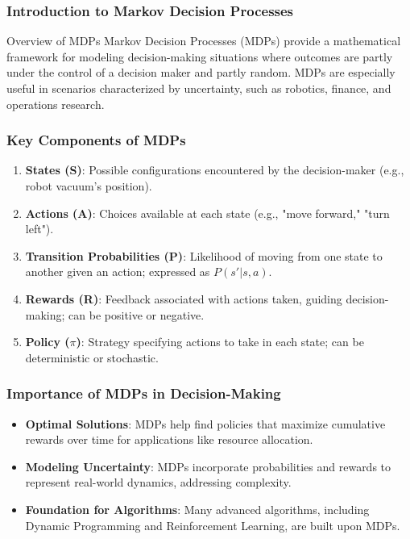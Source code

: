 \documentclass[aspectratio=169]{beamer}
\begin{document}
\frame{\titlepage}

\begin{frame}[fragile]
    \frametitle{Introduction to Markov Decision Processes}
    \begin{block}{Overview of MDPs}
        Markov Decision Processes (MDPs) provide a mathematical framework for modeling decision-making situations where outcomes are partly under the control of a decision maker and partly random. MDPs are especially useful in scenarios characterized by uncertainty, such as robotics, finance, and operations research.
    \end{block}
\end{frame}

\begin{frame}[fragile]
    \frametitle{Key Components of MDPs}
    \begin{enumerate}
        \item \textbf{States (S)}: Possible configurations encountered by the decision-maker (e.g., robot vacuum's position).
        \item \textbf{Actions (A)}: Choices available at each state (e.g., "move forward," "turn left").
        \item \textbf{Transition Probabilities (P)}: Likelihood of moving from one state to another given an action; expressed as \( P(s' | s, a) \).
        \item \textbf{Rewards (R)}: Feedback associated with actions taken, guiding decision-making; can be positive or negative.
        \item \textbf{Policy (\(\pi\))}: Strategy specifying actions to take in each state; can be deterministic or stochastic.
    \end{enumerate}
\end{frame}

\begin{frame}[fragile]
    \frametitle{Importance of MDPs in Decision-Making}
    \begin{itemize}
        \item \textbf{Optimal Solutions}: MDPs help find policies that maximize cumulative rewards over time for applications like resource allocation.
        \item \textbf{Modeling Uncertainty}: MDPs incorporate probabilities and rewards to represent real-world dynamics, addressing complexity.
        \item \textbf{Foundation for Algorithms}: Many advanced algorithms, including Dynamic Programming and Reinforcement Learning, are built upon MDPs.
    \end{itemize}
\end{frame}
\end{document}

